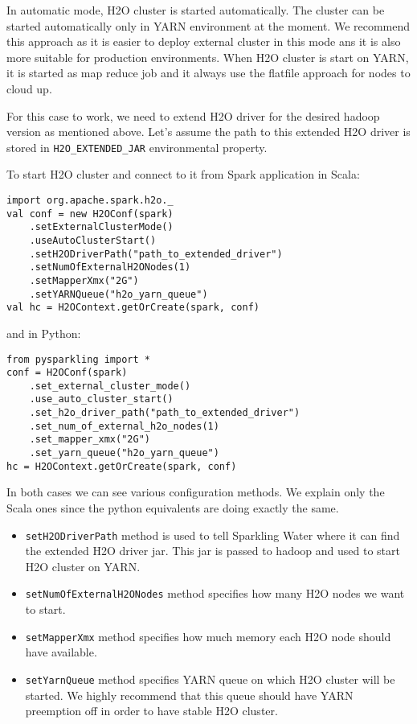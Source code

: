 In automatic mode, H2O cluster is started automatically. The cluster can be started automatically only in YARN environment at the moment. We recommend this approach as it is easier to deploy external cluster in this mode ans it is also more suitable for production environments. When H2O cluster is start on YARN, it is started as map reduce job and it always use the flatfile approach for nodes to cloud up.

For this case to work, we need to extend H2O driver for the desired hadoop version as mentioned above. Let's assume the path to this extended H2O driver is stored in \texttt{H2O\_EXTENDED\_JAR} environmental property.

To start H2O cluster and connect to it from Spark application in Scala:
\begin{lstlisting}[style=Scala]
import org.apache.spark.h2o._
val conf = new H2OConf(spark)
    .setExternalClusterMode()
    .useAutoClusterStart()
    .setH2ODriverPath("path_to_extended_driver")
    .setNumOfExternalH2ONodes(1)
    .setMapperXmx("2G")
    .setYARNQueue("h2o_yarn_queue")
val hc = H2OContext.getOrCreate(spark, conf)
\end{lstlisting}


and in Python:
\begin{lstlisting}[style=Python]
from pysparkling import *
conf = H2OConf(spark)
    .set_external_cluster_mode()
    .use_auto_cluster_start()
    .set_h2o_driver_path("path_to_extended_driver")
    .set_num_of_external_h2o_nodes(1)
    .set_mapper_xmx("2G")
    .set_yarn_queue("h2o_yarn_queue")
hc = H2OContext.getOrCreate(spark, conf)
\end{lstlisting}


In both cases we can see various configuration methods. We explain only the Scala ones since the python equivalents are doing exactly the same.

\begin{itemize}
    \item \texttt{setH2ODriverPath} method is used to tell Sparkling Water where it can find the extended H2O driver jar. This jar is passed to hadoop and used to start H2O cluster on YARN.
    \item \texttt{setNumOfExternalH2ONodes} method specifies how many H2O nodes we want to start.
    \item \texttt{setMapperXmx} method specifies how much memory each H2O node should have available.
    \item \texttt{setYarnQueue} method specifies YARN queue on which H2O cluster will be started. We highly recommend that this queue should have YARN preemption off in order to have stable H2O cluster.
\end{itemize}

